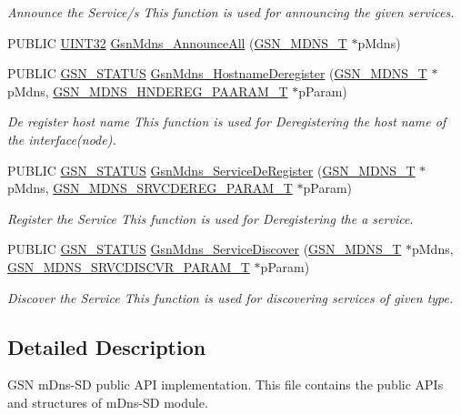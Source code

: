 \begin{DoxyCompactItemize}
\begin{DoxyCompactList}\small\item\em Announce the Service/s This function is used for announcing the given services. \end{DoxyCompactList}\item 
PUBLIC \hyperlink{a00660_gae1e6edbbc26d6fbc71a90190d0266018}{UINT32} \hyperlink{a00526_a339dcc1ce1900b108be80b4d4c59d200}{GsnMdns\_\-AnnounceAll} (\hyperlink{a00140}{GSN\_\-MDNS\_\-T} $\ast$pMdns)
\item 
PUBLIC \hyperlink{a00660_gada5951904ac6110b1fa95e51a9ddc217}{GSN\_\-STATUS} \hyperlink{a00668_ga3233ac8be8015cb17ef7a0d539e77ea1}{GsnMdns\_\-HostnameDeregister} (\hyperlink{a00140}{GSN\_\-MDNS\_\-T} $\ast$pMdns, \hyperlink{a00142}{GSN\_\-MDNS\_\-HNDEREG\_\-PAARAM\_\-T} $\ast$pParam)
\begin{DoxyCompactList}\small\item\em De register host name This function is used for Deregistering the host name of the interface(node). \end{DoxyCompactList}\item 
PUBLIC \hyperlink{a00660_gada5951904ac6110b1fa95e51a9ddc217}{GSN\_\-STATUS} \hyperlink{a00668_ga5153718283ae021aae7c9d7a380005d6}{GsnMdns\_\-ServiceDeRegister} (\hyperlink{a00140}{GSN\_\-MDNS\_\-T} $\ast$pMdns, \hyperlink{a00147}{GSN\_\-MDNS\_\-SRVCDEREG\_\-PARAM\_\-T} $\ast$pParam)
\begin{DoxyCompactList}\small\item\em Register the Service This function is used for Deregistering the a service. \end{DoxyCompactList}\item 
PUBLIC \hyperlink{a00660_gada5951904ac6110b1fa95e51a9ddc217}{GSN\_\-STATUS} \hyperlink{a00668_gaa95c60f5fe29388290848f6d5037683d}{GsnMdns\_\-ServiceDiscover} (\hyperlink{a00140}{GSN\_\-MDNS\_\-T} $\ast$pMdns, \hyperlink{a00148}{GSN\_\-MDNS\_\-SRVCDISCVR\_\-PARAM\_\-T} $\ast$pParam)
\begin{DoxyCompactList}\small\item\em Discover the Service This function is used for discovering services of given type. \end{DoxyCompactList}\end{DoxyCompactItemize}


\subsection{Detailed Description}
GSN mDns-\/SD public API implementation. This file contains the public APIs and structures of mDns-\/SD module. 

